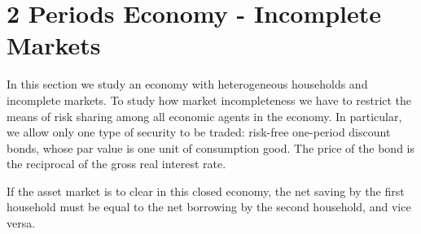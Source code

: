 \documentclass[a4paper,12pt]{article}
\begin{document}
\section{2 Periods Economy - Incomplete Markets}
In this section we study an economy with heterogeneous households and incomplete markets. To study how market incompleteness we have to
restrict the means of risk sharing among all economic agents in the economy. In particular, we allow only one type of security to be traded: risk-free one-period discount bonds, whose par value is one unit of consumption good. The price of the bond is the reciprocal of the gross real interest rate.

If the asset market is to clear in this closed economy, the net saving by the first household must be equal to the net borrowing by the
second household, and vice versa.
\end{document}
